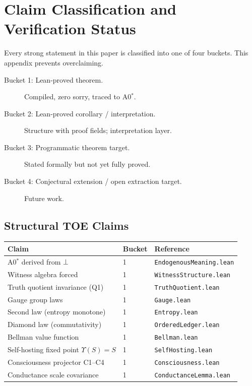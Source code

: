 
\section{Claim Classification and Verification Status}
\label{app:claim-status}

Every strong statement in this paper is classified into one of four buckets.
This appendix prevents overclaiming.

\begin{description}
\item[Bucket 1: Lean-proved theorem.] Compiled, zero sorry, traced to A0$^*$.
\item[Bucket 2: Lean-proved corollary / interpretation.] Structure with proof fields; interpretation layer.
\item[Bucket 3: Programmatic theorem target.] Stated formally but not yet fully proved.
\item[Bucket 4: Conjectural extension / open extraction target.] Future work.
\end{description}

\subsection*{Structural TOE Claims}

\begin{center}
\small
\begin{tabular}{@{}lll@{}}
\hline
\textbf{Claim} & \textbf{Bucket} & \textbf{Reference} \\
\hline
A0$^*$ derived from $\bot$ & 1 & \texttt{EndogenousMeaning.lean} \\
Witness algebra forced & 1 & \texttt{WitnessStructure.lean} \\
Truth quotient invariance (Q1) & 1 & \texttt{TruthQuotient.lean} \\
Gauge group laws & 1 & \texttt{Gauge.lean} \\
Second law (entropy monotone) & 1 & \texttt{Entropy.lean} \\
Diamond law (commutativity) & 1 & \texttt{OrderedLedger.lean} \\
Bellman value function & 1 & \texttt{Bellman.lean} \\
Self-hosting fixed point $\Upsilon(S) = S$ & 1 & \texttt{SelfHosting.lean} \\
Consciousness projector C1--C4 & 1 & \texttt{Consciousness.lean} \\
Conductance scale covariance & 1 & \texttt{ConductanceLemma.lean} \\
\hline
\end{tabular}
\end{center}

